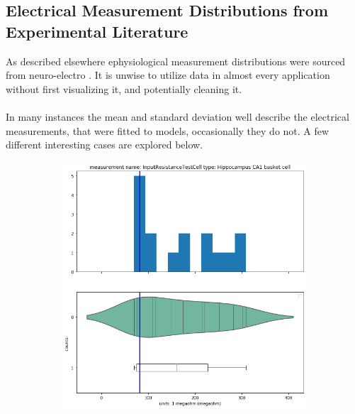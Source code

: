 \subsection{Electrical Measurement Distributions from Experimental Literature}%
As described elsewhere ephysiological measurement distributions were sourced from neuro-electro \cite{tripathy2014neuroelectro}. It is unwise to utilize data in almost every application without first visualizing it, and potentially cleaning it.\\
\\
In many instances the mean and standard deviation well describe the electrical measurements, that were fitted to models, occasionally they do not. A few different interesting cases are explored below.


\begin{figure}
\begin{center}
\centering
\begin{subfigure}{scale=0.5}
  \centering
   \includegraphics[scale=0.45]{notebooks_converted/needata_thesis_files/needata_thesis_5_5}


\end{subfigure}
\end{center}
\end{figure}
